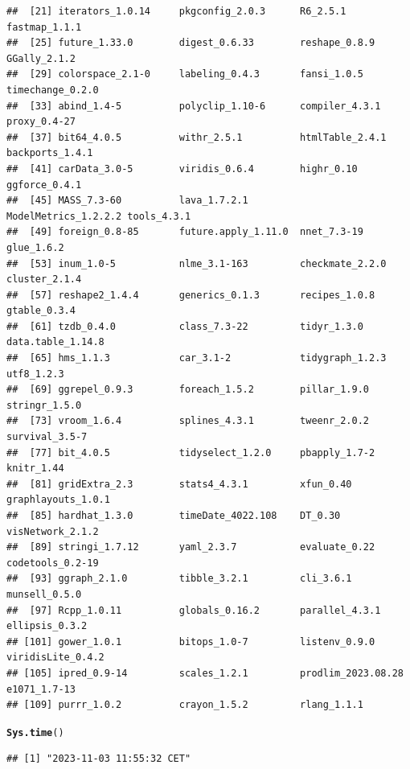 \documentclass{article}\usepackage[]{graphicx}\usepackage[]{xcolor}
\makeatletter
\newcommand{\hlstd}[1]{\textcolor[rgb]{0.345,0.345,0.345}{#1}}%
\newcommand{\hlkwd}[1]{\textcolor[rgb]{0.737,0.353,0.396}{\textbf{#1}}}%
\newenvironment{kframe}{%
 \def\at@end@of@kframe{}%
 \ifinner\ifhmode%
  \def\at@end@of@kframe{\end{minipage}}%
  \begin{minipage}{\columnwidth}%
 \fi\fi%
 \def\FrameCommand##1{\hskip\@totalleftmargin \hskip-\fboxsep
 \colorbox{shadecolor}{##1}\hskip-\fboxsep
     \hskip-\linewidth \hskip-\@totalleftmargin \hskip\columnwidth}%
 \MakeFramed {\advance\hsize-\width
   \@totalleftmargin\z@ \linewidth\hsize
   \@setminipage}}%
 {\par\unskip\endMakeFramed%
 \at@end@of@kframe}
\newenvironment{knitrout}{}{} %
\makeatother
\begin{document}
\begin{knitrout}
\begin{kframe}
\begin{verbatim}
##  [21] iterators_1.0.14     pkgconfig_2.0.3      R6_2.5.1             fastmap_1.1.1       
##  [25] future_1.33.0        digest_0.6.33        reshape_0.8.9        GGally_2.1.2        
##  [29] colorspace_2.1-0     labeling_0.4.3       fansi_1.0.5          timechange_0.2.0    
##  [33] abind_1.4-5          polyclip_1.10-6      compiler_4.3.1       proxy_0.4-27        
##  [37] bit64_4.0.5          withr_2.5.1          htmlTable_2.4.1      backports_1.4.1     
##  [41] carData_3.0-5        viridis_0.6.4        highr_0.10           ggforce_0.4.1       
##  [45] MASS_7.3-60          lava_1.7.2.1         ModelMetrics_1.2.2.2 tools_4.3.1         
##  [49] foreign_0.8-85       future.apply_1.11.0  nnet_7.3-19          glue_1.6.2          
##  [53] inum_1.0-5           nlme_3.1-163         checkmate_2.2.0      cluster_2.1.4       
##  [57] reshape2_1.4.4       generics_0.1.3       recipes_1.0.8        gtable_0.3.4        
##  [61] tzdb_0.4.0           class_7.3-22         tidyr_1.3.0          data.table_1.14.8   
##  [65] hms_1.1.3            car_3.1-2            tidygraph_1.2.3      utf8_1.2.3          
##  [69] ggrepel_0.9.3        foreach_1.5.2        pillar_1.9.0         stringr_1.5.0       
##  [73] vroom_1.6.4          splines_4.3.1        tweenr_2.0.2         survival_3.5-7      
##  [77] bit_4.0.5            tidyselect_1.2.0     pbapply_1.7-2        knitr_1.44          
##  [81] gridExtra_2.3        stats4_4.3.1         xfun_0.40            graphlayouts_1.0.1  
##  [85] hardhat_1.3.0        timeDate_4022.108    DT_0.30              visNetwork_2.1.2    
##  [89] stringi_1.7.12       yaml_2.3.7           evaluate_0.22        codetools_0.2-19    
##  [93] ggraph_2.1.0         tibble_3.2.1         cli_3.6.1            munsell_0.5.0       
##  [97] Rcpp_1.0.11          globals_0.16.2       parallel_4.3.1       ellipsis_0.3.2      
## [101] gower_1.0.1          bitops_1.0-7         listenv_0.9.0        viridisLite_0.4.2   
## [105] ipred_0.9-14         scales_1.2.1         prodlim_2023.08.28   e1071_1.7-13        
## [109] purrr_1.0.2          crayon_1.5.2         rlang_1.1.1
\end{verbatim}
\begin{alltt}
\hlkwd{Sys.time}\hlstd{()}
\end{alltt}
\begin{verbatim}
## [1] "2023-11-03 11:55:32 CET"
\end{verbatim}
\end{kframe}
\end{knitrout}
\end{document}
